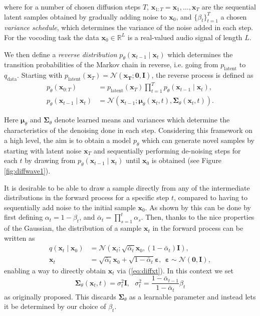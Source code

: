 \documentclass{article}
\begin{document}
where for a number of chosen diffusion steps $T$, $\bm{x}_{1:T} = \bm{x}_1, \dots, \bm{x}_T$ are the sequential latent samples obtained by gradually adding noise to $\bm{x}_0$, and $\{\beta_t\}_{t=1}^T$ a chosen \textit{variance schedule}, which determines the variance of the noise added in each step. For the vocoding task the data $\bm{x}_0 \in \mathbb{R}^L$ is a real-valued audio signal of length $L$.

We then define a \textit{reverse distribution} $p_{\theta}(\bm{x}_{t-1} \mid \bm{x}_t)$ which determines the transition probabilities of the Markov chain in reverse, i.e. going from $p_{\text{latent}}$ to $q_{\text{data}}$. Starting with $p_{\text{latent}}(\bm{x}_T)=\mathcal{N}(\bm{x_T}; \bm{0}, \bm{I})$, the reverse process is defined as
\begin{align}
    p_{\theta}(\bm{x}_{0:T}) &= p_{\text{latent}}(\bm{x}_T) \prod_{t=1}^{T} p_{\theta}(\bm{x}_{t-1} \mid \bm{x}_{t}), \\
    p_{\theta}(\bm{x}_{t-1} \mid \bm{x}_{t}) &= \mathcal{N}(\bm{x}_{t-1} ; \bm{\mu}_{\theta}(\bm{x}_t, t), \bm{\Sigma}_{\theta}(\bm{x}_t, t)).
\end{align}

Here $\bm{\mu}_{\theta}$ and $\bm{\Sigma}_{\theta}$ denote learned means and variances which determine the characteristics of the denoising done in each step. Considering this framework on a high level, the aim is to obtain a model $p_\theta$ which can generate novel samples by starting with latent noise $\bm{x}_T$ and sequentially performing de-noising steps for each $t$ by drawing from $p_\theta(\bm{x}_{t-1} \mid \bm{x}_t)$ until $\bm{x}_0$ is obtained (see Figure \ref{fig:diffwave1}).

It is desirable to be able to draw a sample directly from any of the intermediate  distributions in the forward process for a specific step $t$, compared to having to sequentially add noise to the initial sample $\bm{x}_0$. As shown by \cite{ho2020denoising} this can be done by first defining $\alpha_t = 1 - \beta_t$, and $\bar{\alpha}_t = \prod_{s=1}^t \alpha_s$. Then, thanks to the nice properties of the Gaussian, the distribution of a sample $\bm{x}_t$ in the forward process can be written as
\begin{align}
    q(\bm{x}_t \mid \bm{x}_0) &= \mathcal{N} \left( \bm{x}_t ; \sqrt{\bar{\alpha}_t} \bm{x}_0, (1 - \bar{\alpha}_t) \bm{I} \right), \\
    \bm{x}_t &= \sqrt{\bar{\alpha}_t} \bm{x}_0 + \sqrt{1 - \bar{\alpha}_t} \bm{\varepsilon}, \ \ \bm{\varepsilon} \sim \mathcal{N}(\bm{0}, \bm{I}),
    \label{eq:diffxt}
\end{align}
enabling a way to directly obtain $\bm{x}_t$ via (\ref{eq:diffxt}). In this context we set
\begin{equation}
    \bm{\Sigma}_{\theta}(\bm{x}_t, t) = \sigma_t^2\bm{I}, \ \ \ \sigma_t^2 = \frac{1-    \bar{\alpha}_{t-1}}{1-\bar{\alpha}_t}\beta_t    
\end{equation}
as originally proposed. This discards $\bm{\Sigma}_{\theta}$ as a learnable parameter and instead lets it be determined by our choice of $\beta_t$. 
\end{document}
